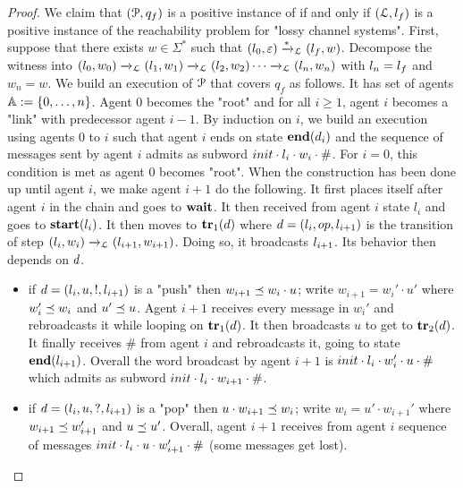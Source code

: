 \begin{proof}
	We claim that $(\mathcal{P}, q_f)$ is a positive instance of \COVER if and only if $(\mathcal{L}, l_f)$ is a positive instance of the reachability problem for "lossy channel systems".
	First, suppose that there exists $w \in \Sigma^*$ such that $(l_0, \varepsilon) \xrightarrow{*}_{\mathcal{L}} (l_f, w)$. Decompose the witness into $(l_0, w_0) \xrightarrow{}_{\mathcal{L}} (l_1, w_1) \xrightarrow{}_{\mathcal{L}} (l_2, w_2) \cdots \xrightarrow{}_{\mathcal{L}} (l_n,w_n)$ with $l_n = l_f$ and $w_n =w$. 
	We build an execution of $\mathcal{P}$ that covers $q_f$ as follows. It has set of agents $\mathbb{A} := \{0,\dots, n\}$. Agent $0$ becomes the "root" and for all $i \geq 1$, agent $i$ becomes a "link" with predecessor agent $i-1$. By induction on $i$, we build an execution using agents $0$ to $i$ such that agent $i$ ends on state $\mathbf{end}(d_i)$ and the sequence of messages sent by agent $i$ admits as subword $\mathsf{init} \cdot \mathsf{\lstate_i} \cdot w_i \cdot \mathsf{\#}$. For $i=0$, this condition is met as agent $0$ becomes "root". When the construction has been done up until agent $i$, we make agent $i+1$ do the following. It first places itself after agent $i$ in the chain and goes to $\mathbf{wait}$. It then received from agent $i$ state $l_i$ and goes to $\mathbf{start}(l_i)$. It then moves to $\mathbf{tr}_1(d)$ where $\ltrans = (\lstate_i, \op, \lstate_{i+1})$ is the transition of step $(l_i, w_i) \xrightarrow{}_{\mathcal{L}} (l_{i+1}, w_{i+1})$. Doing so, it broadcasts $\mathsf{\lstate_{i+1}}$. Its behavior then depends on $d$.
	\begin{itemize}
		\item if $d =(l_i, u,!, l_{i+1})$ is a "push" then $w_{i+1} \preceq w_i \cdot u$; write $w_{i+1} = w_{i}' \cdot u'$ where $w_i' \preceq w_i$ and $u' \preceq u$. Agent $i+1$ receives every message in $w_i'$ and rebroadcasts it while looping on $\mathbf{tr}_1(d)$. It then broadcasts $u$ to get to $\mathbf{tr}_2(d)$. It finally receives $\mathsf{\#}$ from agent $i$ and rebroadcasts it, going to state $\mathbf{end}(l_{i+1})$. Overall the word broadcast by agent $i+1$ is $\mathsf{init} \cdot \mathsf{\lstate_i} \cdot w'_i \cdot u \cdot \mathsf{\#}$ which admits as subword $\mathsf{init} \cdot \mathsf{\lstate_i} \cdot w_{i+1} \cdot \mathsf{\#}$.
		\item if $d =(l_i, u,?, l_{i+1})$ is a "pop" then $u \cdot w_{i+1} \preceq w_i$; write $w_{i} = u' \cdot w_{i+1}'$ where $w_{i+1} \preceq w_{i+1}'$ and $u \preceq u'$. Overall, agent $i+1$ receives from agent $i$ sequence of messages $\mathsf{init} \cdot \mathsf{\lstate_i} \cdot u \cdot w_{i+1}' \cdot \mathsf{\#}$ (some messages get lost). 

\end{itemize}
\end{proof}
